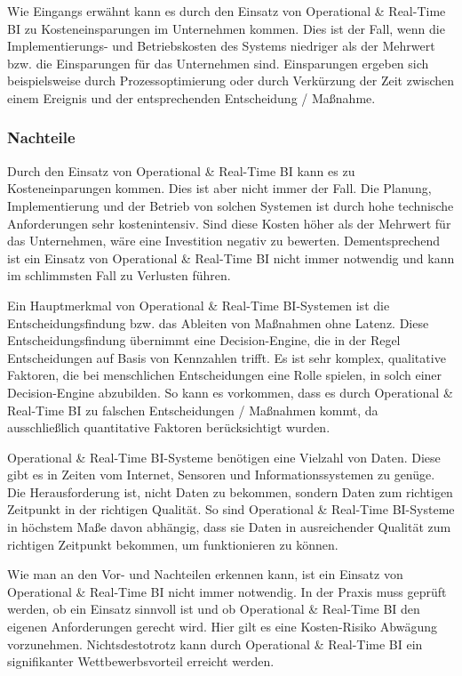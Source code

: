 Wie Eingangs erwähnt kann es durch den Einsatz von Operational \& Real-Time BI zu Kosteneinsparungen im Unternehmen kommen. Dies ist der Fall, wenn die Implementierungs- und Betriebskosten des Systems niedriger als der Mehrwert bzw. die Einsparungen für das Unternehmen sind. \autocite[Vgl.][2]{richard} Einsparungen ergeben sich beispielsweise durch Prozessoptimierung oder durch Verkürzung der Zeit zwischen einem Ereignis und der entsprechenden Entscheidung / Maßnahme. 

\subsubsection{Nachteile}
Durch den Einsatz von Operational \& Real-Time BI kann es zu Kosteneinparungen kommen. Dies ist aber nicht immer der Fall. Die Planung, Implementierung und der Betrieb von solchen Systemen ist durch hohe technische Anforderungen sehr kostenintensiv. \autocite[Vgl.][S. 36]{Sandu2008} Sind diese Kosten höher als der Mehrwert für das Unternehmen, wäre eine Investition negativ zu bewerten. Dementsprechend ist ein Einsatz von Operational \& Real-Time BI nicht immer notwendig und kann im schlimmsten Fall zu Verlusten führen.

Ein Hauptmerkmal von Operational \& Real-Time BI-Systemen ist die Entscheidungsfindung bzw. das Ableiten von Maßnahmen ohne Latenz. Diese Entscheidungsfindung übernimmt eine Decision-Engine, die in der Regel Entscheidungen auf Basis von Kennzahlen trifft. Es ist sehr komplex, qualitative Faktoren, die bei menschlichen Entscheidungen eine Rolle spielen, in solch einer Decision-Engine abzubilden.\autocite[Vgl.][4]{Azvine2006} So kann es vorkommen, dass es durch Operational \& Real-Time BI zu falschen Entscheidungen / Maßnahmen kommt, da ausschließlich quantitative Faktoren berücksichtigt wurden.

Operational \& Real-Time BI-Systeme benötigen eine Vielzahl von Daten. Diese gibt es in Zeiten vom Internet, Sensoren und Informationssystemen zu genüge. Die Herausforderung ist, nicht Daten zu bekommen, sondern Daten zum richtigen Zeitpunkt in der richtigen Qualität. \autocite[Vgl.][160]{Azvine2007} So sind Operational \& Real-Time BI-Systeme in höchstem Maße davon abhängig, dass sie Daten in ausreichender Qualität zum richtigen Zeitpunkt bekommen, um funktionieren zu können. 

Wie man an den Vor- und Nachteilen erkennen kann, ist ein Einsatz von Operational \& Real-Time BI nicht immer notwendig. In der Praxis muss geprüft werden, ob ein Einsatz sinnvoll ist und ob Operational \& Real-Time BI den eigenen Anforderungen gerecht wird. Hier gilt es eine Kosten-Risiko Abwägung vorzunehmen. Nichtsdestotrotz kann durch Operational \& Real-Time BI ein signifikanter Wettbewerbsvorteil erreicht werden. 